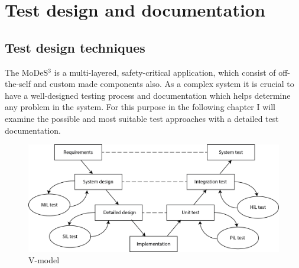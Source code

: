\chapter{Test design and documentation}
\section{Test design techniques}


The MoDeS$^3$ is a multi-layered, safety-critical application, which consist of off-the-self and custom made components also. As a complex system it is crucial to have a well-designed testing process and documentation which helps determine any problem in the system. For this purpose in the following chapter I will examine the possible and most suitable test approaches with a detailed test documentation.

\begin{figure}[!h]
	\centering
	\includegraphics[width=150mm]{figures/testDesign/V_model.png}
	\caption{V-model}
	\label{fig:vModel}
\end{figure}

